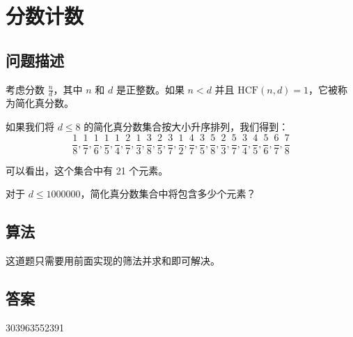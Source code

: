 \section{分数计数}\label{sec:problem72}
\subsection{问题描述}
\begin{tcolorbox}

考虑分数 \( \frac{n}{d} \)，其中 \( n \) 和 \( d \) 是正整数。如果 \( n < d \) 并且 \( \text{HCF}(n, d) = 1 \)，它被称为简化真分数。

如果我们将 \( d \leq 8 \) 的简化真分数集合按大小升序排列，我们得到：
\[ \frac{1}{8}, \frac{1}{7}, \frac{1}{6}, \frac{1}{5}, \frac{1}{4}, \frac{2}{7}, \frac{1}{3}, \frac{3}{8}, \frac{2}{5}, \frac{3}{7}, \frac{1}{2}, \frac{4}{7}, \frac{3}{5}, \frac{5}{8}, \frac{2}{3}, \frac{5}{7}, \frac{3}{4}, \frac{4}{5}, \frac{5}{6}, \frac{6}{7}, \frac{7}{8} \]

可以看出，这个集合中有 21 个元素。

对于 \( d \leq 1000000 \)，简化真分数集合中将包含多少个元素？
\end{tcolorbox}

\subsection{算法}
这道题只需要用前面实现的筛法并求和即可解决。

\subsection{答案}
303963552391
